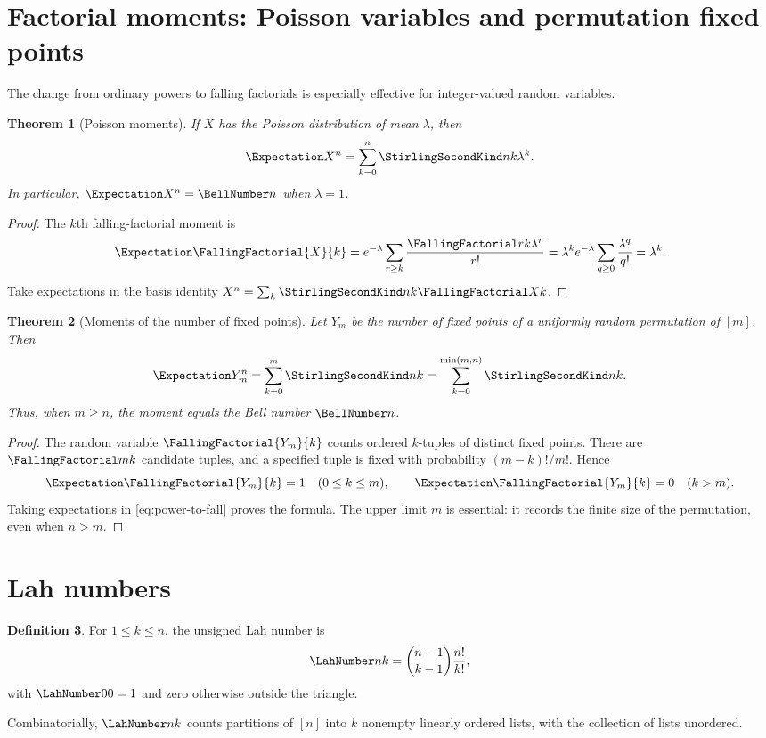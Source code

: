 \documentclass[11pt,a4paper,oneside,openany]{book}
\newtheorem{theorem}{Theorem}[chapter]
\theoremstyle{definition}
\newtheorem{definition}[theorem]{Definition}
\theoremstyle{remark}
\begin{document}
\section{Factorial moments: Poisson variables and permutation fixed points}
The change from ordinary powers to falling factorials is especially effective for
integer-valued random variables.

\begin{theorem}[Poisson moments]
\label{thm:poisson-stirling-moments}
If $X$ has the Poisson distribution of mean $\lambda$, then
\begin{equation}
\label{eq:poisson-stirling-moments}
 \Expectation X^n=\sum_{k=0}^{n}\StirlingSecondKind nk\lambda^k.
\end{equation}
In particular, $\Expectation X^n=\BellNumber n$ when $\lambda=1$.
\end{theorem}
\begin{proof}
The $k$th falling-factorial moment is
\[
 \Expectation\FallingFactorial{X}{k}
 =e^{-\lambda}\sum_{r\ge k}\frac{\FallingFactorial r k\lambda^r}{r!}
 =\lambda^ke^{-\lambda}\sum_{q\ge0}\frac{\lambda^q}{q!}
 =\lambda^k.
\]
Take expectations in the basis identity
$X^n=\sum_k\StirlingSecondKind nk\FallingFactorial Xk$.
\end{proof}

\begin{theorem}[Moments of the number of fixed points]
\label{thm:fixed-point-stirling-moments}
Let $Y_m$ be the number of fixed points of a uniformly random permutation of
$[m]$.  Then
\begin{equation}
\label{eq:fixed-point-stirling-moments}
 \Expectation Y_m^n=\sum_{k=0}^{m}\StirlingSecondKind nk
 =\sum_{k=0}^{\min(m,n)}\StirlingSecondKind nk.
\end{equation}
Thus, when $m\ge n$, the moment equals the Bell number $\BellNumber n$.
\end{theorem}
\begin{proof}
The random variable $\FallingFactorial{Y_m}{k}$ counts ordered $k$-tuples of distinct fixed
points.  There are $\FallingFactorial m k$ candidate tuples, and a specified tuple is fixed
with probability $(m-k)!/m!$.  Hence
\[
 \Expectation\FallingFactorial{Y_m}{k}=1\quad(0\le k\le m),
 \qquad
 \Expectation\FallingFactorial{Y_m}{k}=0\quad(k>m).
\]
Taking expectations in \eqref{eq:power-to-fall} proves the formula.  The upper
limit $m$ is essential: it records the finite size of the permutation, even when
$n>m$.
\end{proof}
\section{Lah numbers}
\begin{definition}
For $1\le k\le n$, the unsigned Lah number is
\begin{equation}\label{eq:lah-def}
 \LahNumber nk=\binom{n-1}{k-1}\frac{n!}{k!},
\end{equation}
with $\LahNumber00=1$ and zero otherwise outside the triangle.
\end{definition}
Combinatorially, $\LahNumber nk$ counts partitions of $[n]$ into $k$ nonempty linearly
ordered lists, with the collection of lists unordered.
\end{document}
